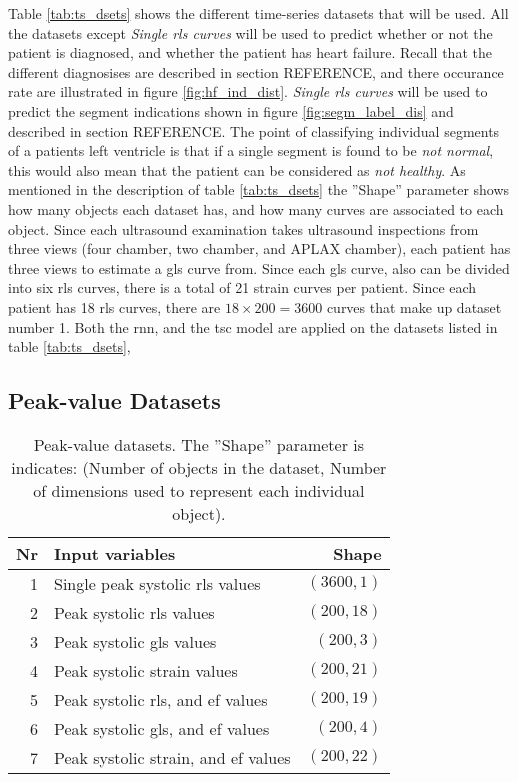 Table \ref{tab:ts_dsets} shows the different time-series datasets that will be used. 
All the datasets except \textit{Single \acrshort{rls} curves} will be used to predict whether or not the patient is diagnosed, and whether the patient has heart failure.
Recall that the different diagnosises are described in section REFERENCE, and there occurance rate are illustrated in figure \ref{fig:hf_ind_dist}.
\textit{Single \acrshort{rls} curves} will be used to predict the segment indications shown in figure \ref{fig:segm_label_dis} and described in section REFERENCE. 
The point of classifying individual segments of a patients left ventricle is that if a single segment is found to be \textit{not normal}, 
this would also mean that the patient can be considered as \textit{not healthy}.
As mentioned in the description of table \ref{tab:ts_dsets} the ''Shape'' parameter shows how many objects each dataset has, and how many curves are associated to each object. 
Since each ultrasound examination takes ultrasound inspections from three views (four chamber, two chamber, and APLAX chamber), each patient has three views to estimate a \acrshort{gls} curve from. 
Since each \acrshort{gls} curve, also can be divided into six \acrshort{rls} curves, there is a total of 21 strain curves per patient. 
Since each patient has 18 \acrshort{rls} curves, there are $18 \times 200 = 3600$ curves that make up dataset number 1.
Both the \acrshort{rnn}, and the \acrshort{tsc} model are applied on the datasets listed in table \ref{tab:ts_dsets}, 
\bigskip

\subsection{Peak-value Datasets}

\begin{table*}[h]
    \centering
    \begin{tabular}{ rlr }
        \toprule
        Nr & Input variables                     & Shape \\
        \midrule                              
        1  & Single peak systolic \acrshort{rls} values                & $(3600,1)$ \\
        2  & Peak systolic \acrshort{rls} values                       & $(200,18)$ \\
        3  & Peak systolic \acrshort{gls} values                       & $(200,3)$  \\
        4  & Peak systolic strain values                               & $(200,21)$ \\
        5  & Peak systolic \acrshort{rls}, and \acrshort{ef} values    & $(200,19)$ \\
        6  & Peak systolic \acrshort{gls}, and \acrshort{ef} values    & $(200,4)$  \\
        7  & Peak systolic strain, and \acrshort{ef} values            & $(200,22)$ \\
        \bottomrule
    \end{tabular}
    \caption{Peak-value datasets. The ''Shape'' parameter is indicates: (Number of objects in the dataset, Number of dimensions used to represent each individual object).}
    \label{tab:pv_dsets}
\end{table*}

